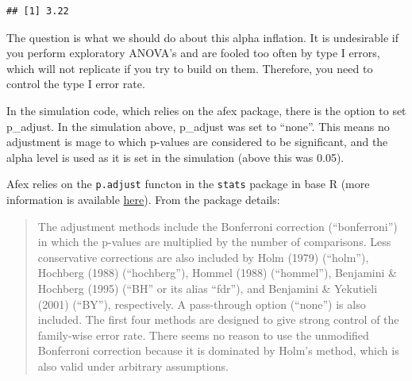 \documentclass[
]{book}
\newenvironment{Shaded}{\begin{snugshade}}{\end{snugshade}}
\newcommand{\ControlFlowTok}[1]{\textcolor[rgb]{0.13,0.29,0.53}{\textbf{#1}}}
\newcommand{\DecValTok}[1]{\textcolor[rgb]{0.00,0.00,0.81}{#1}}
\newcommand{\FloatTok}[1]{\textcolor[rgb]{0.00,0.00,0.81}{#1}}
\newcommand{\KeywordTok}[1]{\textcolor[rgb]{0.13,0.29,0.53}{\textbf{#1}}}
\newcommand{\NormalTok}[1]{#1}
\newcommand{\OperatorTok}[1]{\textcolor[rgb]{0.81,0.36,0.00}{\textbf{#1}}}
\newcommand{\StringTok}[1]{\textcolor[rgb]{0.31,0.60,0.02}{#1}}
\begin{document}
\begin{Shaded}
\end{Shaded}

\begin{verbatim}
## [1] 3.22
\end{verbatim}

The question is what we should do about this alpha inflation. It is undesirable if you perform exploratory ANOVA's and are fooled too often by type I errors, which will not replicate if you try to build on them. Therefore, you need to control the type I error rate.

In the simulation code, which relies on the afex package, there is the option to set p\_adjust. In the simulation above, p\_adjust was set to ``none''. This means no adjustment is mage to which p-values are considered to be significant, and the alpha level is used as it is set in the simulation (above this was 0.05).

Afex relies on the \texttt{p.adjust} functon in the \texttt{stats} package in base R (more information is available \href{https://www.rdocumentation.org/packages/stats/versions/3.1.1/topics/p.adjust}{here}). From the package details:

\begin{quote}
The adjustment methods include the Bonferroni correction (``bonferroni'') in which the p-values are multiplied by the number of comparisons. Less conservative corrections are also included by Holm (1979) (``holm''), Hochberg (1988) (``hochberg''), Hommel (1988) (``hommel''), Benjamini \& Hochberg (1995) (``BH'' or its alias ``fdr''), and Benjamini \& Yekutieli (2001) (``BY''), respectively. A pass-through option (``none'') is also included. The first four methods are designed to give strong control of the family-wise error rate. There seems no reason to use the unmodified Bonferroni correction because it is dominated by Holm's method, which is also valid under arbitrary assumptions.
\end{quote}
\end{document}
